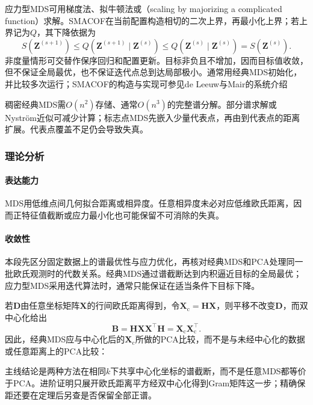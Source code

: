 应力型MDS可用梯度法、拟牛顿法或（scaling by majorizing a complicated function）求解。SMACOF在当前配置构造相切的二次上界，再最小化上界；若上界记为$Q$，其下降依据为
\[
  S(\bm{Z}^{(s+1)})
  \leq Q(\bm{Z}^{(s+1)}\mid\bm{Z}^{(s)})
  \leq Q(\bm{Z}^{(s)}\mid\bm{Z}^{(s)})
  =S(\bm{Z}^{(s)}).
\]
非度量情形可交替作保序回归和配置更新。目标非负且不增加，因而目标值收敛，但不保证全局最优，也不保证迭代点总到达局部极小。通常用经典MDS初始化，并比较多次运行；SMACOF的构造与实现可参见de Leeuw与Mair的系统介绍

稠密经典MDS需$O(n^2)$存储、通常$O(n^3)$的完整谱分解。部分谱求解或Nystr\"om近似可减少计算；标志点MDS先嵌入少量代表点，再由到代表点的距离扩展。代表点覆盖不足仍会导致失真。

\subsubsection{理论分析}
\label{sec:dim-mds-theory}

\paragraph{表达能力}
MDS用低维点间几何拟合距离或相异度。任意相异度未必对应低维欧氏距离，因而正特征值截断或应力最小化也可能保留不可消除的失真。

\paragraph{收敛性}

本段先区分固定数据上的谱最优性与应力优化，再核对经典MDS和PCA处理同一批欧氏观测时的代数关系。经典MDS通过谱截断达到内积逼近目标的全局最优；应力型MDS采用迭代算法时，通常只能保证在适当条件下目标下降。

若$\bm{D}$由任意坐标矩阵$\bm{X}$的行间欧氏距离得到，令$\bm{X}_{\mathrm{c}}=\bm{H}\bm{X}$，则平移不改变$\bm{D}$，而双中心化给出
\[
  \bm{B}=\bm{H}\bm{X}\bm{X}^{\top}\bm{H}
  =\bm{X}_{\mathrm{c}}\bm{X}_{\mathrm{c}}^{\top}.
\]
因此，经典MDS应与中心化后的$\bm{X}_{\mathrm{c}}$所做的PCA比较，而不是与未经中心化的数据或任意距离上的PCA比较：

主线结论是两种方法在相同$k$下共享中心化坐标的谱截断，而不是任意MDS都等价于PCA。进阶证明只展开欧氏距离平方经双中心化得到Gram矩阵这一步；精确保距还要在定理后另查是否保留全部正谱。

